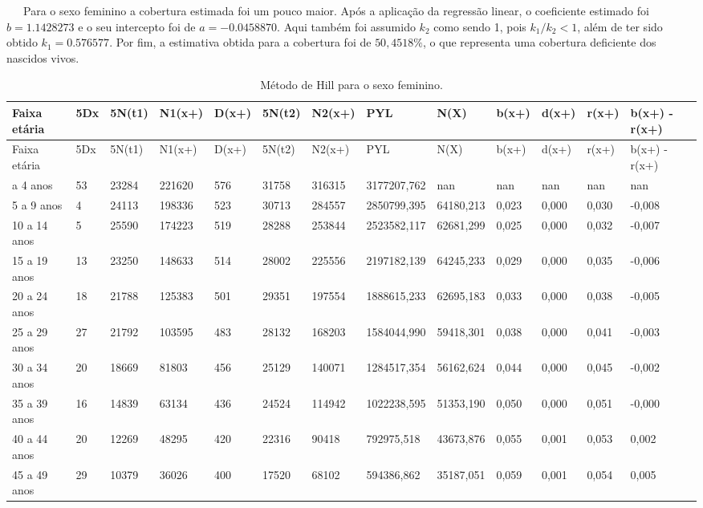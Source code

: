 \documentclass[
  12pt,
  a4paper,
]{scrreprt}
\begin{document}
~~~Para o sexo feminino a cobertura estimada foi um pouco maior. Após a
aplicação da regressão linear, o coeficiente estimado foi
\(b = 1.1428273\) e o seu intercepto foi de \(a = -0.0458870\). Aqui
também foi assumido \(k_{2}\) como sendo 1, pois \(k_{1} / k_{2} < 1\),
além de ter sido obtido \(k_{1} = 0.576577\). Por fim, a estimativa
obtida para a cobertura foi de \(50,4518\%\), o que representa uma
cobertura deficiente dos nascidos vivos.

\begin{longtable}[]{@{}lllllllllllll@{}}
\caption{Método de Hill para o sexo
feminino.}\label{T_28869}\tabularnewline
\toprule\noalign{}
Faixa etária & 5Dx & 5N(t1) & N1(x+) & D(x+) & 5N(t2) & N2(x+) & PYL &
N(X) & b(x+) & d(x+) & r(x+) & b(x+) - r(x+) \\
\midrule\noalign{}
\endfirsthead
\toprule\noalign{}
Faixa etária & 5Dx & 5N(t1) & N1(x+) & D(x+) & 5N(t2) & N2(x+) & PYL &
N(X) & b(x+) & d(x+) & r(x+) & b(x+) - r(x+) \\
\midrule\noalign{}
\endhead
\bottomrule\noalign{}
\endlastfoot
0 a 4 anos & 53 & 23284 & 221620 & 576 & 31758 & 316315 & 3177207,762 &
nan & nan & nan & nan & nan \\
5 a 9 anos & 4 & 24113 & 198336 & 523 & 30713 & 284557 & 2850799,395 &
64180,213 & 0,023 & 0,000 & 0,030 & -0,008 \\
10 a 14 anos & 5 & 25590 & 174223 & 519 & 28288 & 253844 & 2523582,117 &
62681,299 & 0,025 & 0,000 & 0,032 & -0,007 \\
15 a 19 anos & 13 & 23250 & 148633 & 514 & 28002 & 225556 & 2197182,139
& 64245,233 & 0,029 & 0,000 & 0,035 & -0,006 \\
20 a 24 anos & 18 & 21788 & 125383 & 501 & 29351 & 197554 & 1888615,233
& 62695,183 & 0,033 & 0,000 & 0,038 & -0,005 \\
25 a 29 anos & 27 & 21792 & 103595 & 483 & 28132 & 168203 & 1584044,990
& 59418,301 & 0,038 & 0,000 & 0,041 & -0,003 \\
30 a 34 anos & 20 & 18669 & 81803 & 456 & 25129 & 140071 & 1284517,354 &
56162,624 & 0,044 & 0,000 & 0,045 & -0,002 \\
35 a 39 anos & 16 & 14839 & 63134 & 436 & 24524 & 114942 & 1022238,595 &
51353,190 & 0,050 & 0,000 & 0,051 & -0,000 \\
40 a 44 anos & 20 & 12269 & 48295 & 420 & 22316 & 90418 & 792975,518 &
43673,876 & 0,055 & 0,001 & 0,053 & 0,002 \\
45 a 49 anos & 29 & 10379 & 36026 & 400 & 17520 & 68102 & 594386,862 &
35187,051 & 0,059 & 0,001 & 0,054 & 0,005 \\

\end{longtable}
\end{document}
